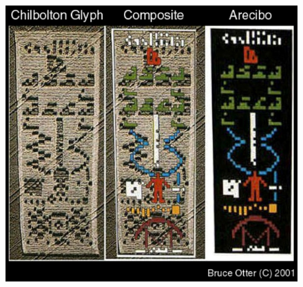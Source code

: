\documentclass{report}
\begin{document}
\begin{figure}
  \includegraphics[width=\textwidth]{photograph/chibolton-arceibo-comparison.jpg}
\label{chi:comparison}
\end{figure}
\end{document}
